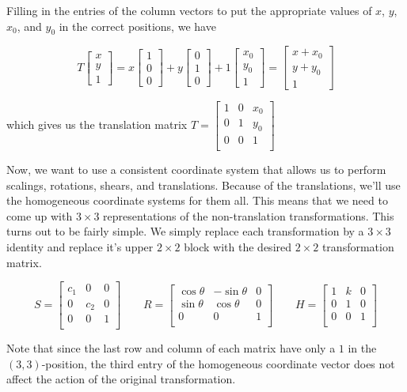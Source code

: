 \documentclass[12pt]{article}
\newcommand{\nin}{\noindent}
\newcommand{\vthree}{\vspace{3mm}}
\newcommand{\mymat}[1]{
\left[
\begin{array}{rrrrrrrrrrrrrrrrrrrrrrrrrrrrrrrrrrrrrrr}
#1
\end{array}
\right]
}
\begin{document}
\nin Filling in the entries of the column vectors to put the appropriate values of $x$, $y$, $x_0$, and $y_0$ in the correct positions, we have

\vthree

\[
T \mymat{x \\ y \\ 1} =
x\mymat{1 \\ 0 \\ 0} +
y\mymat{0 \\ 1 \\ 0} +
1\mymat{x_0 \\ y_0 \\ 1}
=
\mymat{x + x_0 \\ y + y_0 \\ 1}
\]

\vthree

\nin which gives us the translation matrix $T =
\mymat{
 1 & 0 & x_0 \\
 0 & 1 & y_0 \\
 0 & 0 & 1 \\
}
$

\vthree

\nin Now, we want to use a consistent coordinate system that allows us to perform scalings, rotations, shears, and translations.  Because of the translations, we'll use the homogeneous coordinate systems for them all.  This means that we need to come up with $3 \times 3$ representations of the non-translation transformations.  This turns out to be fairly simple.  We simply replace each transformation by a $3 \times 3$ identity and replace it's upper $2 \times 2$ block with the desired $2 \times 2$ transformation matrix.

\vthree

\[
S =
\mymat{
c_1 & 0 & 0 \\
0 & c_2 & 0 \\
0 & 0 & 1 \\
}
\quad \quad
R =
\mymat{
\cos\theta & -\sin\theta & 0 \\
\sin\theta & \cos\theta & 0 \\
0 & 0 & 1 \\
}
\quad \quad
H =
\mymat{
1 & k & 0 \\
0 & 1 & 0 \\
0 & 0 & 1 \\
}
\]

\vthree

\nin Note that since the last row and column of each matrix have only a $1$ in the $(3,3)$-position, the third entry of the homogeneous coordinate vector does not affect the action of the original transformation.
\end{document}
